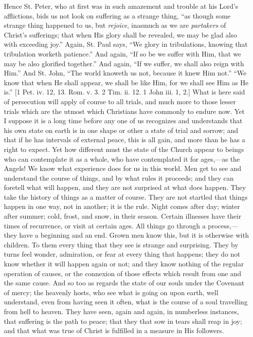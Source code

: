 Hence St. Peter, who at first was in such amazement and trouble at
his Lord's afflictions, bids us not look on suffering as a strange
thing, ``as though some strange thing happened to us, but \emph{rejoice},
inasmuch as we are \emph{partakers} of Christ's sufferings; that when
His glory shall be revealed, we may be glad also with exceeding
joy.'' Again, St. Paul says, ``We glory in tribulations,
knowing that tribulation worketh patience.'' And again, ``If
so be we suffer with Him, that we may be also glorified
together.'' And again, ``If we suffer, we shall also reign
with Him.'' And St. John, ``The world knoweth us not, because
it knew Him not.'' ``We know that when He shall appear, we
shall be like Him, for we shall see Him as He is.'' [1 Pet. iv.
12, 13. Rom. v. 3. 2 Tim. ii. 12. 1 John iii. 1, 2.] What is here said
of persecution will apply of course to all trials, and much more to
those lesser trials which are the utmost which Christians have
commonly to endure now. Yet I suppose it is a long time before any one
of us recognizes and understands that his own state on earth is in one
shape or other a state of trial and sorrow; and that if he has
intervals of external peace, this is all gain, and more than he has a
right to expect. Yet how different must the state of the Church appear
to beings who can contemplate it as a whole, who have contemplated it
for ages,—as the Angels! We know what experience does for us in this
world. Men get to see and understand the course of things, and by what
rules it proceeds; and they can foretell what will happen, and they
are not surprised at what does happen. They take the history of things
as a matter of course. They are not startled that things happen in one
way, not in another; it is the rule. Night comes after day; winter
after summer; cold, frost, and snow, in their season. Certain
illnesses have their times of recurrence, or visit at certain ages.
All things go through a process,—they have a beginning and an end.
Grown men know this, but it is otherwise with children. To them every
thing that they see is strange and surprising. They by turns feel
wonder, admiration, or fear at every thing that happens; they do not
know whether it will happen again or not; and they know nothing of the
regular operation of causes, or the connexion of those effects which
result from one and the same cause. And so too as regards the state of
our souls under the Covenant of mercy; the heavenly hosts, who see
what is going on upon earth, well understand, even from having seen it
often, what is the course of a soul travelling from hell to heaven.
They have seen, again and again, in numberless instances, that
suffering is the path to peace; that they that sow in tears shall reap
in joy; and that what was true of Christ is fulfilled in a measure in
His followers.

